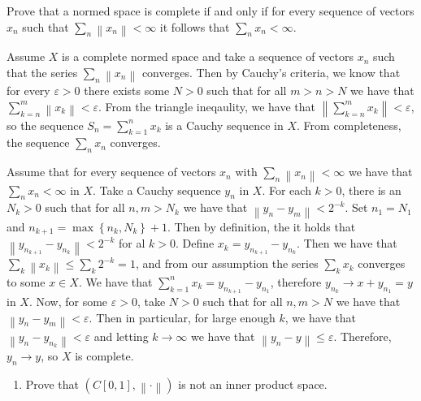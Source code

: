 \documentclass[11pt]{article} %
\newcommand{\norm}[1]{\left\lVert#1\right\rVert}
\newcommand{\inpr}[2]{\left<#1, #2\right>}
\begin{document}
\begin{Exercise}
Prove that a normed space is complete if and only if for every sequence of vectors $x_n$ such that $\sum_n \norm{x_n} < \infty$ it follows that $\sum_n x_n < \infty$.
\end{Exercise}

\begin{Answer}
Assume $X$ is a complete normed space and take a sequence of vectors $x_n$ such that the series $\sum_n \norm{x_n}$ converges. Then by Cauchy's criteria, we know that for every $\varepsilon > 0$ there exists some $N > 0$ such that for all $m > n > N$ we have that $\sum_{k=n}^m \norm{x_k} < \varepsilon$. From the triangle ineqaulity, we have that $\norm{\sum_{k=n}^m x_k} < \varepsilon$, so the sequence $S_n = \sum_{k = 1}^n x_k$ is a Cauchy sequence in $X$. From completeness, the sequence $\sum_n x_n$ converges.

Assume that for every sequence of vectors $x_n$ with $\sum_n \norm{x_n} < \infty$ we have that $\sum_n x_n < \infty$ in $X$. Take a Cauchy sequence $y_n$ in $X$. For each $k > 0$, there is an $N_k > 0$ such that for all $n, m > N_k$ we have that $\norm{y_n - y_m} < 2^{-k}$. Set $n_1 = N_1$ and $n_{k+1} = \max\left\{n_k, N_k\right\} + 1$. Then by definition, the it holds that $\norm{y_{n_{k+1}} - y_{n_k}} < 2^{-k}$ for al $k >0$. Define $x_k = y_{n_{k+1}} - y_{n_k}$. Then we have that $\sum_k \norm{x_k} \leq \sum_k 2^{-k} = 1$, and from our assumption the series $\sum_k x_k$ converges to some $x\in X$. We have that $\sum_{k=1}^n x_k = y_{n_{k+1}} - y_{n_1}$, therefore $y_{n_k} \to x + y_{n_1} = y$ in $X$. Now, for some $\varepsilon > 0$, take $N > 0$ such that for all $n,m > N$ we have that $\norm{y_n -y_m} < \varepsilon$. Then in particular, for large enough $k$, we have that $\norm{y_n -y_{n_k}} < \varepsilon$ and letting $k \to \infty$ we have that $\norm{y_n -y} \leq \varepsilon$. Therefore, $y_n \to y$, so $X$ is complete. 
\end{Answer}

\begin{Exercise}
\begin{enumerate}
\begin{item}
Prove that in an inner product space (over $\mathbb{C}$), for all vector $x,y$ we have
\[\inpr{x}{y} = \frac{1}{4} = \left(\norm{x + y}^2 - \norm{x - y}^2 + i \norm{x + iy}^2 - i \norm{x - iy}^2 \right) \]
\end{item}
\item Prove that $\left(C\left[0,1\right], \norm{\cdot}\right)$ is not an inner product space.
\end{enumerate}
\end{Exercise}
\end{document}
